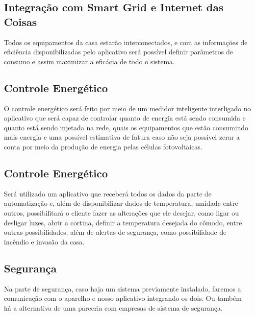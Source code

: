  	        \subsection{Integração com Smart Grid e Internet das Coisas}
 	            \par Todos os equipamentos da casa estarão interconectados, e com as informações de eficiência disponibilizadas pelo aplicativo será possível definir parâmetros de  consumo e assim maximizar a eficácia de todo o sistema.

 	        \subsection{Controle Energético}
	            \par O controle energético será feito por meio de um medidor inteligente interligado  no aplicativo que será capaz de controlar quanto de energia está sendo consumida e quanto está sendo injetada na rede, quais os equipamentos que estão consumindo mais energia e uma possível estimativa de fatura caso não seja possível zerar a conta por meio da produção de energia pelas células fotovoltaicas. \cite{solarvolt}

	       \subsection{Controle Energético}
	            \par Será utilizado um aplicativo que receberá todos os dados da parte de automatização e, além de disponibilizar dados de temperatura, umidade entre outros, possibilitará o cliente fazer as alterações que ele desejar, como ligar ou desligar luzes, abrir a cortina, definir a temperatura desejada do cômodo, entre outras possibilidades. além de alertas de segurança, como possibilidade de incêndio e invasão da casa.

	       \subsection{Segurança}
	            \par Na parte de segurança, caso haja um sistema previamente instalado, faremos a comunicação com o aparelho e nosso aplicativo integrando os dois. Ou também há a alternativa de uma parceria com empresas de sistema de segurança.

